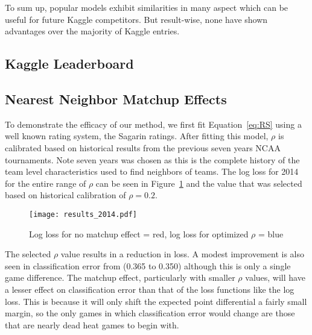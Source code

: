 To sum up, popular models exhibit similarities in many aspect which can be useful for future Kaggle competitors. But result-wise, none have shown advantages over the majority of Kaggle entries. 

\subsection{Kaggle Leaderboard}
\subsection{Nearest Neighbor Matchup Effects}
To demonstrate the efficacy of our method, we first fit Equation~\ref{eq:RS} using a well known rating system, the Sagarin ratings. After fitting this model, $\rho$ is calibrated based on historical results from the previous seven years NCAA tournaments. Note seven years was chosen as this is the complete history of the team level characteristics used to find neighbors of teams. The log loss for 2014 for the entire range of $\rho$ can be seen in Figure~\ref{fig:result} and the value that was selected based on historical calibration of $\rho =0.2$.
\begin{figure}[h!]
\centering
\texttt{[image: results\_2014.pdf]}
\caption{Log loss for no matchup effect = red, log loss for optimized $\rho$ = blue}
\label{fig:result}
\end{figure} 
The selected $\rho$ value results in a reduction in loss. A modest improvement is also seen in classification error from (0.365 to 0.350) although this is only a single game difference. The matchup effect, particularly with smaller $\rho$ values, will have a lesser effect on classification error than that of the loss functions like the log loss. This is because it will only shift the expected point differential a fairly small margin, so the only games in which classification error would change are those that are nearly dead heat games to begin with.

